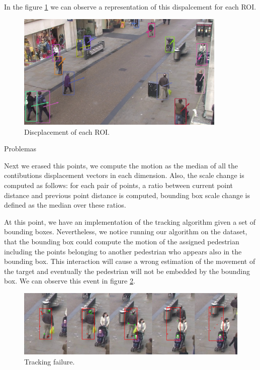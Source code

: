 In the figure \ref{solution5} we can observe a representation of this dispalcement for each ROI.

\begin{figure}[H]
\centering         
\includegraphics[width=10cm]{intro/alcover2.png}
\caption{Discplacement of each ROI.} \label{solution5}
\end{figure}



Problemas

Next we erased this points, we compute the motion as the median of all the contibutions displacement vectors in each dimension. Also, the scale change is computed as follows: for each pair of points, a ratio between current point distance and previous point distance is computed, bounding box scale change is defined as the median over these ratios. 

At this point, we have an implementation of the tracking algorithm given a set of bounding boxes. Nevertheless, we notice running our algorithm on the dataset, that the bounding box could compute the motion of the assigned pedestrian including the points belonging to another pedestrian who appears also in the bounding box. This interaction will cause a wrong estimation of the movement of the target and eventually the pedestrian will not be embedded by the bounding box. We can observe this event in figure \ref{traccs}.


\begin{figure}[H]
\centering         
\includegraphics[width=0.9\linewidth]{velocidadas/mateuPont.png}
\caption{Tracking failure.} \label{traccs}
\end{figure}


